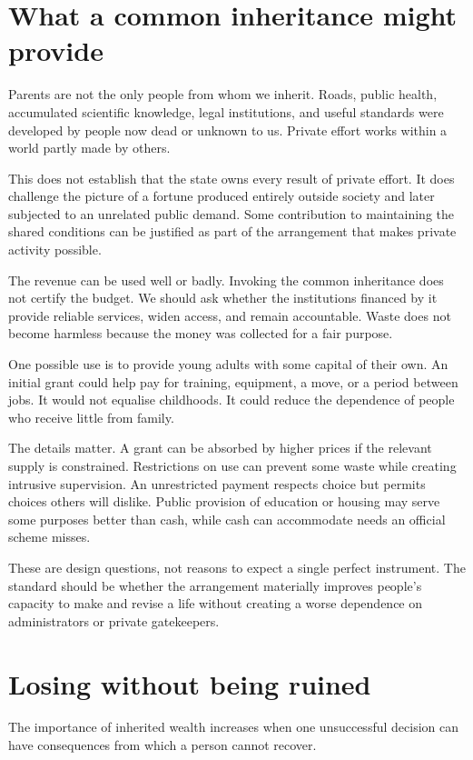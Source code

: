 \documentclass[12pt,a4paper]{book}
\begin{document}
\section*{What a common inheritance might provide}

Parents are not the only people from whom we inherit. Roads, public health, accumulated scientific knowledge, legal institutions, and useful standards were developed by people now dead or unknown to us. Private effort works within a world partly made by others.

This does not establish that the state owns every result of private effort. It does challenge the picture of a fortune produced entirely outside society and later subjected to an unrelated public demand. Some contribution to maintaining the shared conditions can be justified as part of the arrangement that makes private activity possible.

The revenue can be used well or badly. Invoking the common inheritance does not certify the budget. We should ask whether the institutions financed by it provide reliable services, widen access, and remain accountable. Waste does not become harmless because the money was collected for a fair purpose.

One possible use is to provide young adults with some capital of their own. An initial grant could help pay for training, equipment, a move, or a period between jobs. It would not equalise childhoods. It could reduce the dependence of people who receive little from family.

The details matter. A grant can be absorbed by higher prices if the relevant supply is constrained. Restrictions on use can prevent some waste while creating intrusive supervision. An unrestricted payment respects choice but permits choices others will dislike. Public provision of education or housing may serve some purposes better than cash, while cash can accommodate needs an official scheme misses.

These are design questions, not reasons to expect a single perfect instrument. The standard should be whether the arrangement materially improves people's capacity to make and revise a life without creating a worse dependence on administrators or private gatekeepers.

\section*{Losing without being ruined}

The importance of inherited wealth increases when one unsuccessful decision can have consequences from which a person cannot recover.
\end{document}

